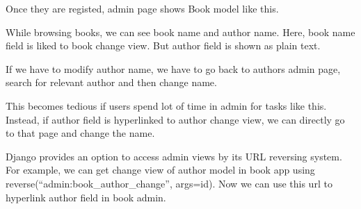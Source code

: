 \documentclass[a5paper,10pt,english]{sphinxmanual}
\begin{document}
Once they are registed, admin page shows Book model like this.


While browsing books, we can see book name and author name. Here, book name field is liked to book change view. But author field is shown as plain text.

If we have to modify author name, we have to go back to authors admin page, search for relevant author and then change name.

This becomes tedious if users spend lot of time in admin for tasks like this. Instead, if author field is hyperlinked to author change view, we can directly go to that page and change the name.

Django provides an option to access admin views by its URL reversing system. For example, we can get change view of author model in book app using reverse(“admin:book\_author\_change”, args=id). Now we can use this url to hyperlink author field in book admin.

\begin{sphinxVerbatim}[commandchars=\\\{\}]
   
   


 
        

      
           \PYG{p}{[}\PYG{p}{]}
             
         
      
\end{sphinxVerbatim}
\end{document}

